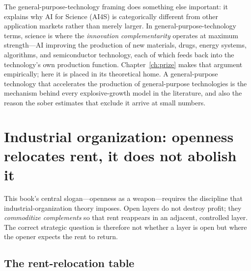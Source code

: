 The general-purpose-technology framing does something else important: it explains why AI for Science (AI4S) is categorically different from other application markets rather than merely larger. In general-purpose-technology terms, science is where the \emph{innovation complementarity} operates at maximum strength---AI improving the production of new materials, drugs, energy systems, algorithms, and semiconductor technology, each of which feeds back into the technology's own production function. Chapter~\ref{ch:prize} makes that argument empirically; here it is placed in its theoretical home. A general-purpose technology that accelerates the production of general-purpose technologies is the mechanism behind every explosive-growth model in the literature, and also the reason the sober estimates that exclude it arrive at small numbers.

\section{Industrial organization: openness relocates rent, it does not abolish it}
\label{sec:io}

This book's central slogan---openness as a weapon---requires the discipline that industrial-organization theory imposes. Open layers do not destroy profit; they \emph{commoditize complements} so that rent reappears in an adjacent, controlled layer. The correct strategic question is therefore not whether a layer is open but where the opener expects the rent to return.

\subsection{The rent-relocation table}

